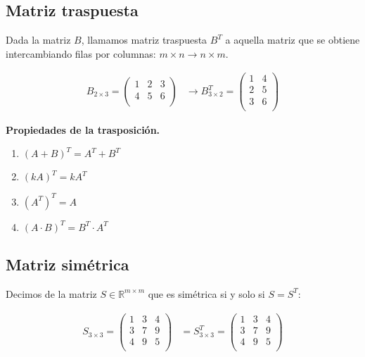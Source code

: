 \documentclass[12pt]{article}
\begin{document}
\subsection{Matriz traspuesta}

Dada la matriz \(B\),
llamamos matriz traspuesta \(B^{T}\) a aquella matriz que se obtiene
intercambiando filas por columnas: \(m \times n \rightarrow n \times m\).

\begin{align*}
  B_{2 \times 3} = \begin{pmatrix}
                     1 & 2 & 3 \\
                     4 & 5 & 6 \\
                   \end{pmatrix} & \rightarrow
  B^{T}_{3 \times 2} = \begin{pmatrix}
                         1 & 4 \\
                         2 & 5 \\
                         3 & 6 \\
                       \end{pmatrix}
\end{align*}

\textbf{Propiedades de la trasposición.}

\begin{enumerate}
  \item \((A+B)^{T} = A^{T} + B^{T}\)
  \item \((kA)^{T} = kA^{T}\)
  \item \((A^{T})^{T} = A\)
  \item \((A \cdot B)^{T} = B^{T} \cdot A^{T}\)
\end{enumerate}

\subsection{Matriz simétrica}

Decimos de la matriz \(S \in \mathbb{R}^{m \times m}\) que es simétrica
si y solo si \(S = S^{T}\):

\begin{align*}
  S_{3 \times 3} = \begin{pmatrix}
                     1 & 3 & 4 \\
                     3 & 7 & 9 \\
                     4 & 9 & 5 \\
                   \end{pmatrix} & =
  S^{T}_{3 \times 3} = \begin{pmatrix}
                         1 & 3 & 4 \\
                         3 & 7 & 9 \\
                         4 & 9 & 5 \\
                       \end{pmatrix} \\
\end{align*}
\end{document}

